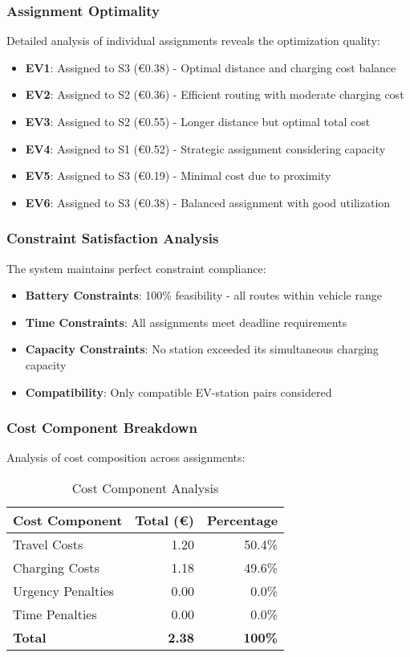 \documentclass[12pt,a4paper]{article}
\begin{document}
\subsubsection{Assignment Optimality}
Detailed analysis of individual assignments reveals the optimization quality:

\begin{itemize}
    \item \textbf{EV1}: Assigned to S3 (€0.38) - Optimal distance and charging cost balance
    \item \textbf{EV2}: Assigned to S2 (€0.36) - Efficient routing with moderate charging cost
    \item \textbf{EV3}: Assigned to S2 (€0.55) - Longer distance but optimal total cost
    \item \textbf{EV4}: Assigned to S1 (€0.52) - Strategic assignment considering capacity
    \item \textbf{EV5}: Assigned to S3 (€0.19) - Minimal cost due to proximity
    \item \textbf{EV6}: Assigned to S3 (€0.38) - Balanced assignment with good utilization
\end{itemize}

\subsubsection{Constraint Satisfaction Analysis}
The system maintains perfect constraint compliance:

\begin{itemize}
    \item \textbf{Battery Constraints}: 100\% feasibility - all routes within vehicle range
    \item \textbf{Time Constraints}: All assignments meet deadline requirements
    \item \textbf{Capacity Constraints}: No station exceeded its simultaneous charging capacity
    \item \textbf{Compatibility}: Only compatible EV-station pairs considered
\end{itemize}

\subsubsection{Cost Component Breakdown}
Analysis of cost composition across assignments:

\begin{table}[h]
\centering
\caption{Cost Component Analysis}
\begin{tabular}{@{}lrr@{}}
\toprule
Cost Component & Total (€) & Percentage \\
\midrule
Travel Costs & 1.20 & 50.4\% \\
Charging Costs & 1.18 & 49.6\% \\
Urgency Penalties & 0.00 & 0.0\% \\
Time Penalties & 0.00 & 0.0\% \\
\midrule
\textbf{Total} & \textbf{2.38} & \textbf{100\%} \\
\bottomrule
\end{tabular}
\end{table}
\end{document}
